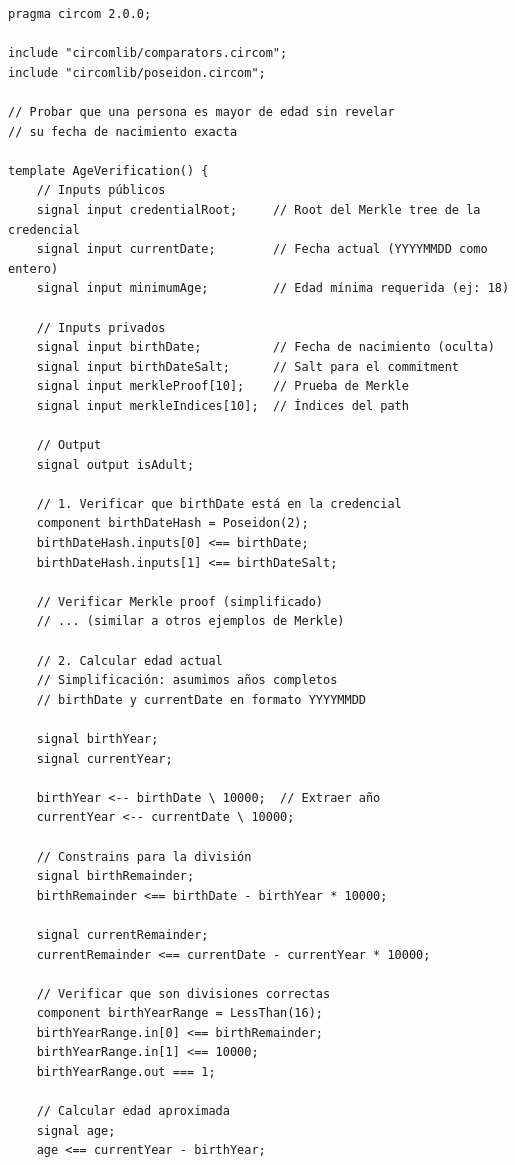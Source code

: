 \documentclass[11pt,a4paper,twoside]{book}
\theoremstyle{definition}
\theoremstyle{remark}
\begin{document}
\begin{lstlisting}[language=circom, caption={Circuito para age verification con ZK}]
pragma circom 2.0.0;

include "circomlib/comparators.circom";
include "circomlib/poseidon.circom";

// Probar que una persona es mayor de edad sin revelar
// su fecha de nacimiento exacta

template AgeVerification() {
    // Inputs públicos
    signal input credentialRoot;     // Root del Merkle tree de la credencial
    signal input currentDate;        // Fecha actual (YYYYMMDD como entero)
    signal input minimumAge;         // Edad mínima requerida (ej: 18)
    
    // Inputs privados
    signal input birthDate;          // Fecha de nacimiento (oculta)
    signal input birthDateSalt;      // Salt para el commitment
    signal input merkleProof[10];    // Prueba de Merkle
    signal input merkleIndices[10];  // Índices del path
    
    // Output
    signal output isAdult;
    
    // 1. Verificar que birthDate está en la credencial
    component birthDateHash = Poseidon(2);
    birthDateHash.inputs[0] <== birthDate;
    birthDateHash.inputs[1] <== birthDateSalt;
    
    // Verificar Merkle proof (simplificado)
    // ... (similar a otros ejemplos de Merkle)
    
    // 2. Calcular edad actual
    // Simplificación: asumimos años completos
    // birthDate y currentDate en formato YYYYMMDD
    
    signal birthYear;
    signal currentYear;
    
    birthYear <-- birthDate \ 10000;  // Extraer año
    currentYear <-- currentDate \ 10000;
    
    // Constrains para la división
    signal birthRemainder;
    birthRemainder <== birthDate - birthYear * 10000;
    
    signal currentRemainder;
    currentRemainder <== currentDate - currentYear * 10000;
    
    // Verificar que son divisiones correctas
    component birthYearRange = LessThan(16);
    birthYearRange.in[0] <== birthRemainder;
    birthYearRange.in[1] <== 10000;
    birthYearRange.out === 1;
    
    // Calcular edad aproximada
    signal age;
    age <== currentYear - birthYear;
    

\end{lstlisting}
\end{document}

